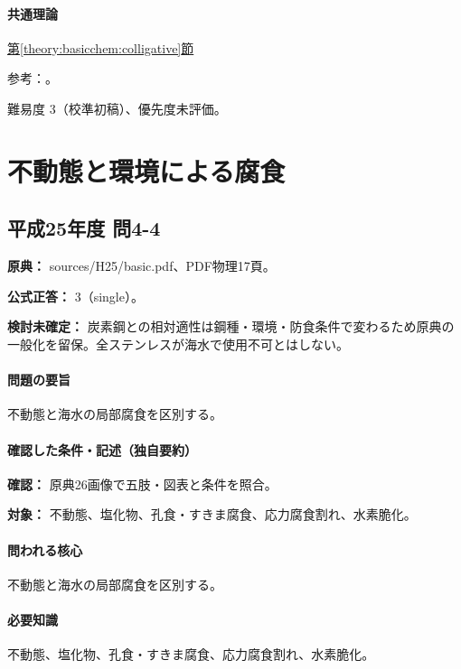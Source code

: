\paragraph{共通理論} \hyperref[theory:basicchem:colligative]{第\ref*{theory:basicchem:colligative}節}

\par 参考：\cite{chem55_colligative}。

\par 難易度 3（校準初稿）、優先度未評価。

\section{不動態と環境による腐食}

\subsection{平成25年度 問4-4}
\label{q:h25-reg-basic-4-4}

\noindent\textbf{原典：} sources/H25/basic.pdf、PDF物理17頁。

\textbf{公式正答：} 3（single）。

\par\textbf{検討未確定：} 炭素鋼との相対適性は鋼種・環境・防食条件で変わるため原典の一般化を留保。全ステンレスが海水で使用不可とはしない。

\paragraph{問題の要旨} 不動態と海水の局部腐食を区別する。

\paragraph{確認した条件・記述（独自要約）}\mbox{}\par

\noindent\textbf{確認：} 原典26画像で五肢・図表と条件を照合。\par

\noindent\textbf{対象：} 不動態、塩化物、孔食・すきま腐食、応力腐食割れ、水素脆化。\par

\paragraph{問われる核心} 不動態と海水の局部腐食を区別する。

\paragraph{必要知識} 不動態、塩化物、孔食・すきま腐食、応力腐食割れ、水素脆化。


